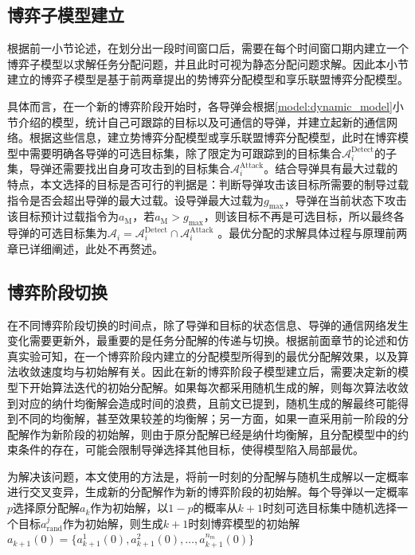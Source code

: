 \subsection{博弈子模型建立}
\label{game_stage:submodel}

根据前一小节论述，在划分出一段时间窗口后，需要在每个时间窗口期内建立一个博弈子模型以求解任务分配问题，并且此时可视为静态分配问题求解。因此本小节建立的博弈子模型是基于前两章提出的势博弈分配模型和享乐联盟博弈分配模型。

具体而言，在一个新的博弈阶段开始时，各导弹会根据\ref{model:dynamic_model}小节介绍的模型，统计自己可跟踪的目标以及可通信的导弹，并建立起新的通信网络。根据这些信息，建立势博弈分配模型或享乐联盟博弈分配模型，此时在博弈模型中需要明确各导弹的可选目标集，除了限定为可跟踪到的目标集合$\mathcal{A}^{\text{Detect}}_i$的子集，导弹还需要找出自身可攻击到的目标集合$\mathcal{A}^{\text{Attack}}_i$。结合导弹具有最大过载的特点，本文选择的目标是否可行的判据是：判断导弹攻击该目标所需要的制导过载指令是否会超出导弹的最大过载。设导弹最大过载为$g_{\text{max}}$，导弹在当前状态下攻击该目标预计过载指令为$a_{\text{M}}$，若$a_{\text{M}}>g_{\text{max}}$，则该目标不再是可选目标，所以最终各导弹的可选目标集为$\mathcal{A}_i = \mathcal{A}^{\text{Detect}}_i \cap \mathcal{A}^{\text{Attack}}_i$
。最优分配的求解具体过程与原理前两章已详细阐述，此处不再赘述。

\subsection{博弈阶段切换}
\label{game_stage:stage_transform}

在不同博弈阶段切换的时间点，除了导弹和目标的状态信息、导弹的通信网络发生变化需要更新外，最重要的是任务分配解的传递与切换。根据前面章节的论述和仿真实验可知，在一个博弈阶段内建立的分配模型所得到的最优分配解效果，以及算法收敛速度均与初始解有关。因此在新的博弈阶段子模型建立后，需要决定新的模型下开始算法迭代的初始分配解。如果每次都采用随机生成的解，则每次算法收敛到对应的纳什均衡解会造成时间的浪费，且前文已提到，随机生成的解最终可能得到不同的均衡解，甚至效果较差的均衡解；另一方面，如果一直采用前一阶段的分配解作为新阶段的初始解，则由于原分配解已经是纳什均衡解，且分配模型中的约束条件的存在，可能会限制导弹选择其他目标，使得模型陷入局部最优。

为解决该问题，本文使用的方法是，将前一时刻的分配解与随机生成解以一定概率进行交叉变异，生成新的分配解作为新的博弈阶段的初始解。每个导弹以一定概率$p$选择原分配解$a_k$作为初始解，以$1-p$的概率从$k+1$时刻可选目标集中随机选择一个目标$a_{\text{rand}}^j$作为初始解，则生成$k+1$时刻博弈模型的初始解$a_{k+1}(0)=\{a_{k+1}^1(0),a_{k+1}^2(0),\dots,a_{k+1}^{n_m}(0)\}$

